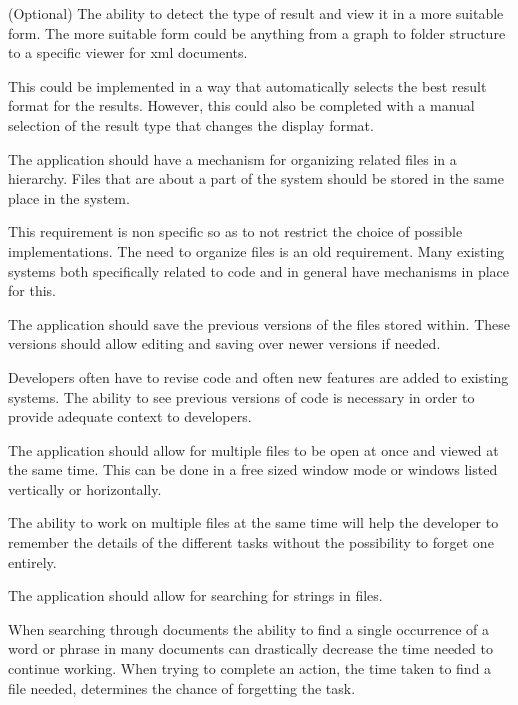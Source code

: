 \begin{requirement}{(Optional)}
The ability to detect the type of result and view it in a
more suitable form. The more suitable form could be anything from a
graph to folder structure to a specific viewer for xml documents.

This could be implemented in a way that automatically selects the best result
format for the results. However, this could also be completed with a manual
selection of the result type that changes the display format.
\end{requirement}

\begin{requirement}
The application should have a mechanism for organizing related files in
a hierarchy. Files that are about a part of the system should be stored
in the same place in the system.

This requirement is non specific so as to not restrict the choice of possible
implementations. The need to organize files is an old requirement. Many
existing systems both specifically related to code and in general have
mechanisms in place for this.
\end{requirement}

\begin{requirement}
The application should save the previous versions of the files stored within.
These versions should allow editing and saving over newer versions if needed.

Developers often have to revise code and often new features are added to
existing systems. The ability to see previous versions of code is necessary in
order to provide adequate context to developers.
\end{requirement}

\begin{requirement}
The application should allow for multiple files to
be open at once and viewed at the same time. This can be done in a free
sized window mode or windows listed vertically or horizontally.

The ability to work on multiple files at the same time will help the developer
to remember the details of the different tasks without the possibility to
forget one entirely.
\end{requirement}

\begin{requirement}
The application should allow for searching for strings in files.

When searching through documents the ability to find a single occurrence of a
word or phrase in many documents can drastically decrease the time needed to
continue working. When trying to complete an action, the time taken to find a
file needed, determines the chance of forgetting the task.
\end{requirement}

